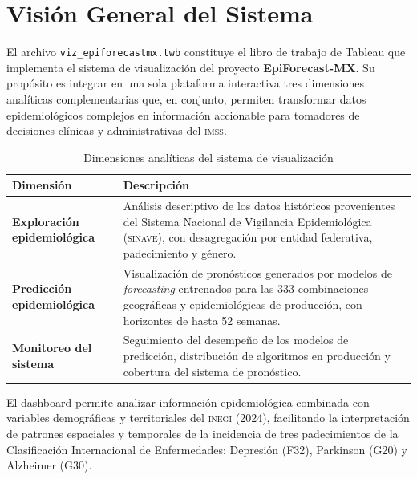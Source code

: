 \documentclass[12pt, letterpaper]{article}
\newcommand{\imss}{\textnormal{\textsc{imss}}}
\begin{document}
\newpage
\tableofcontents
\newpage
\listoffigures
\listoftables
\newpage

\section{Visión General del Sistema}\label{sec:vision}

El archivo \texttt{viz\_epiforecastmx.twb} constituye el libro de trabajo de Tableau que implementa el sistema de visualización del proyecto \textbf{EpiForecast-MX}. Su propósito es integrar en una sola plataforma interactiva tres dimensiones analíticas complementarias que, en conjunto, permiten transformar datos epidemiológicos complejos en información accionable para tomadores de decisiones clínicas y administrativas del {\imss}.

\begin{table}[H]
\centering
\caption{Dimensiones analíticas del sistema de visualización}
\label{tab:dimensiones}
\small
\begin{tabularx}{\textwidth}{>{\bfseries}l X}
\toprule
\textbf{Dimensión} & \textbf{Descripción} \\
\midrule
Exploración epidemiológica & Análisis descriptivo de los datos históricos provenientes del Sistema Nacional de Vigilancia Epidemiológica (\textsc{sinave}), con desagregación por entidad federativa, padecimiento y género. \\
Predicción epidemiológica  & Visualización de pronósticos generados por modelos de \textit{forecasting} entrenados para las 333 combinaciones geográficas y epidemiológicas de producción, con horizontes de hasta 52 semanas. \\
Monitoreo del sistema      & Seguimiento del desempeño de los modelos de predicción, distribución de algoritmos en producción y cobertura del sistema de pronóstico. \\
\bottomrule
\end{tabularx}
\end{table}

El dashboard permite analizar información epidemiológica combinada con variables demográficas y territoriales del \textsc{inegi} (2024), facilitando la interpretación de patrones espaciales y temporales de la incidencia de tres padecimientos de la Clasificación Internacional de Enfermedades: Depresión (F32), Parkinson (G20) y Alzheimer (G30).
\end{document}
